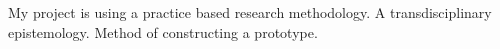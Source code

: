 \begin{fcom}
  My project is using a practice based research methodology. A transdisciplinary epistemology. Method of constructing a prototype.
\end{fcom}



%
%
%
%
%
%
%
%
%
%
